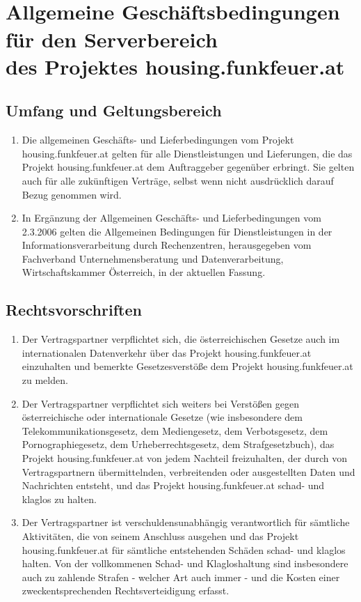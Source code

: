 \documentclass[parskip=half]{article}
\begin{document}
\thispagestyle{fancy}
\vspace*{-10pt}
\section*{\\Allgemeine Geschäftsbedingungen für den Serverbereich \\ des
Projektes housing.funkfeuer.at}
\vspace*{10pt}

\subsection{Umfang und Geltungsbereich}
\begin{enumerate}
\item Die allgemeinen Geschäfts- und Lieferbedingungen vom Projekt
housing.funkfeuer.at gelten für alle Dienstleistungen und Lieferungen, die das
Projekt housing.funkfeuer.at dem Auftraggeber gegenüber erbringt. Sie gelten
auch für alle zukünftigen Verträge, selbst wenn nicht ausdrücklich darauf
Bezug genommen wird.
\item In Ergänzung der Allgemeinen Geschäfts- und Lieferbedingungen vom
2.3.2006 gelten die Allgemeinen Bedingungen für Dienstleistungen in der
Informationsverarbeitung durch Rechenzentren, herausgegeben vom Fachverband
Unternehmensberatung und Datenverarbeitung, Wirtschaftskammer Österreich,
in der aktuellen Fassung.
\end{enumerate}

\subsection{ Rechtsvorschriften}
\begin{enumerate}
\item Der Vertragspartner verpflichtet sich, die österreichischen Gesetze auch im
internationalen Datenverkehr über das Projekt housing.funkfeuer.at einzuhalten und
bemerkte Gesetzesverstöße dem Projekt housing.funkfeuer.at zu melden.
\item Der Vertragspartner verpflichtet sich weiters bei Verstößen gegen österreichische
oder internationale Gesetze (wie insbesondere dem Telekommunikationsgesetz, dem
Mediengesetz, dem Verbotsgesetz, dem Pornographiegesetz, dem Urheberrechtsgesetz,
dem Strafgesetzbuch), das Projekt housing.funkfeuer.at von jedem Nachteil freizuhalten,
der durch von Vertragspartnern übermittelnden, verbreitenden oder ausgestellten Daten
und Nachrichten entsteht, und das Projekt housing.funkfeuer.at schad- und klaglos zu
halten.
\item Der Vertragspartner ist verschuldensunabhängig verantwortlich für sämtliche
Aktivitäten, die von seinem Anschluss ausgehen und das Projekt housing.funkfeuer.at für
sämtliche entstehenden Schäden schad- und klaglos halten. Von der vollkommenen Schad- und
Klagloshaltung sind insbesondere auch zu zahlende Strafen - welcher Art auch immer - und die
Kosten einer zweckentsprechenden Rechtsverteidigung erfasst.
\end{enumerate}
\end{document}
